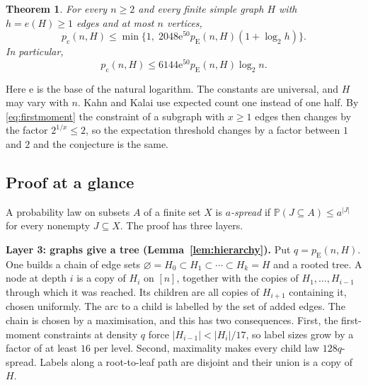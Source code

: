 \documentclass[11pt]{article}
\newtheorem{theorem}{Theorem}[section]
\numberwithin{equation}{section}
\newcommand{\PP}{\mathbb P}
\newcommand{\pc}{p_{\mathrm c}}
\newcommand{\pE}{p_{\mathrm E}}
\newcommand{\ee}{\mathrm e}
\begin{document}
\begin{theorem}\label{thm:main}
For every $n\ge2$ and every finite simple graph $H$ with $h=e(H)\ge1$
edges and at most $n$ vertices,
\begin{equation}\label{eq:stronger}
 \pc(n,H)\le
 \min\{1,\;2048\ee^{50}\pE(n,H)(1+\log_2 h)\}.
\end{equation}
In particular,
\[
 \pc(n,H)\le6144\ee^{50}\pE(n,H)\log_2 n.
\]
\end{theorem}

Here $\ee$ is the base of the natural logarithm. The constants are
universal, and $H$ may vary with $n$. Kahn and Kalai use expected count
one instead of one half. By \eqref{eq:firstmoment} the constraint of a
subgraph with $x\ge1$ edges then changes by the factor $2^{1/x}\le2$,
so the expectation threshold changes by a factor between $1$ and $2$
and the conjecture is the same.

\subsection{Proof at a glance}\label{sec:glance}

A probability law on subsets $A$ of a finite set $X$ is
\emph{$a$-spread} if $\PP(J\subseteq A)\le a^{|J|}$ for every nonempty
$J\subseteq X$. The proof has three layers.

\begin{center}
\end{center}

\noindent\textbf{Layer 3: graphs give a tree (Lemma~\ref{lem:hierarchy}).}
Put $q=\pE(n,H)$. One builds a chain of edge sets
$\varnothing=H_0\subset H_1\subset\cdots\subset H_k=H$ and a rooted
tree. A node at depth $i$ is a copy of $H_i$ on $[n]$, together with the
copies of $H_1,\dots,H_{i-1}$ through which it was reached. Its children
are all copies of $H_{i+1}$ containing it, chosen uniformly. The arc to
a child is labelled by the set of added edges. The chain is chosen by a
maximisation, and this has two consequences. First, the first-moment
constraints at density $q$ force $|H_{i-1}|<|H_i|/17$, so label sizes
grow by a factor of at least $16$ per level. Second, maximality makes
every child law $128q$-spread. Labels along a root-to-leaf path are
disjoint and their union is a copy of $H$.
\end{document}
